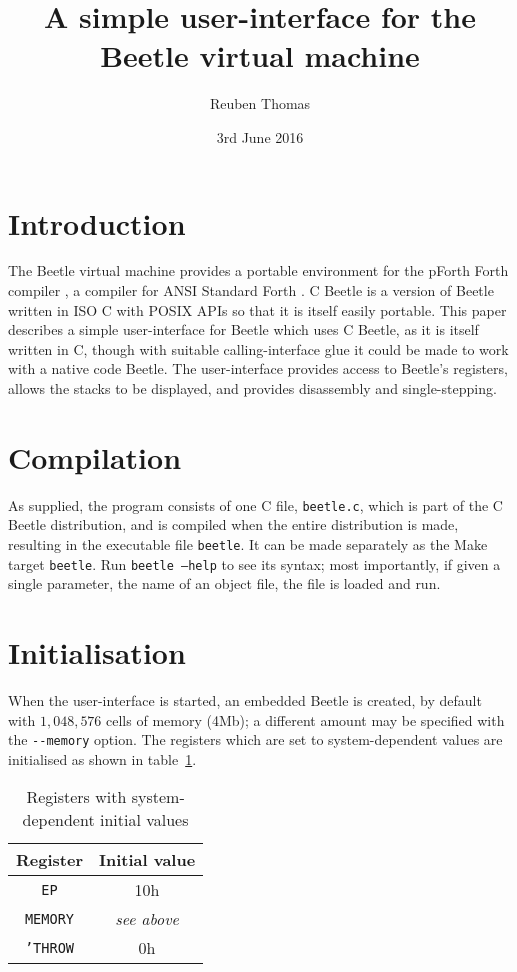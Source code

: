 \documentclass{article}
\title{A simple user-interface for the\\Beetle virtual machine}
\author{Reuben Thomas}
\date{3rd June 2016}
\begin{document}
\maketitle


\section{Introduction}

The Beetle virtual machine \cite{beetle} provides a portable
environment for the pForth Forth compiler \cite{beetledis}, a compiler
for ANSI Standard Forth \cite{ANSIforth}. C Beetle \cite{cbeetle} is
a version of Beetle written in ISO C with POSIX APIs so that it is
itself easily portable. This paper describes a simple user-interface
for Beetle which uses C Beetle, as it is itself written in C, though
with suitable calling-interface glue it could be made to work with a
native code Beetle. The user-interface provides access to Beetle's
registers, allows the stacks to be displayed, and provides disassembly
and single-stepping.


\section{Compilation}

As supplied, the program consists of one C file, {\tt beetle.c}, which
is part of the C Beetle distribution, and is compiled when the entire
distribution is made, resulting in the executable file {\tt beetle}.
It can be made separately as the Make target {\tt beetle}. Run {\tt beetle --help} to see its syntax; most importantly, if given a single parameter, the name of an object file, the file is loaded and run.


\section{Initialisation}
\label{uifaceinit}

When the user-interface is started, an embedded Beetle is created, by default with $1,048,576$ cells of memory (4Mb); a different amount may be specified with the \verb|--memory| option. The registers which are set to system-dependent values are initialised as shown in table~\ref{uinittable}.

\begin{table}[htbp]
\begin{center}
\begin{tabular}{|c|c|} \hline
\rule[-2mm]{0mm}{6mm}\bf Register & \bf Initial value \\ \hline
{\tt EP} & 10h \\
{\tt MEMORY} & \emph{see above} \\
{\tt 'THROW} & 0h \\ \hline
\end{tabular}
\caption{\label{uinittable}Registers with system-dependent initial values}
\end{center}
\end{table}
\end{document}
